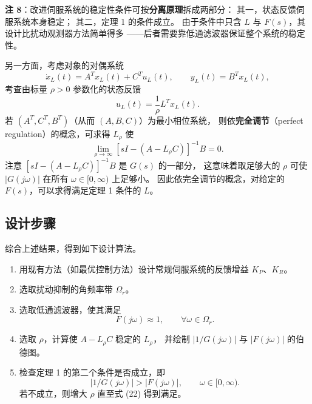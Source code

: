 \documentclass[11pt,a4paper]{ctexart}
\begin{document}
\textbf{注 8}：改进伺服系统的稳定性条件可按\textbf{分离原理}拆成两部分：
其一，状态反馈伺服系统本身稳定；
其二，定理 1 的条件成立。
由于条件中只含 $L$ 与 $F(s)$，其设计比扰动观测器方法简单得多
——后者需要靠低通滤波器保证整个系统的稳定性。

另一方面，考虑对象的对偶系统
\begin{equation}
\dot x_L(t)=A^{T}x_L(t)+C^{T}u_L(t),\qquad
y_L(t)=B^{T}x_L(t),
\end{equation}
考查由标量 $\rho>0$ 参数化的状态反馈
\begin{equation}
u_L(t)=\frac{1}{\rho}L^{T}x_L(t).
\end{equation}
若 $(A^{T},C^{T},B^{T})$（从而 $(A,B,C)$）为最小相位系统，
则依\textbf{完全调节}（perfect regulation）的概念，可求得 $L_\rho$ 使
\begin{equation}
\lim_{\rho\to\infty}\left[sI-(A-L_\rho C)\right]^{-1}B=0.
\end{equation}
注意 $\left[sI-(A-L_\rho C)\right]^{-1}B$ 是 $G(s)$ 的一部分，
这意味着取足够大的 $\rho$ 可使 $|G(j\omega)|$ 在所有 $\omega\in[0,\infty)$ 上足够小。
因此依完全调节的概念，对给定的 $F(s)$，可以求得满足定理 1 条件的 $L$。

\subsection{设计步骤}

综合上述结果，得到如下设计算法。

\begin{enumerate}[label=\textbf{Step \arabic*)}]
\item 用现有方法（如最优控制方法）设计常规伺服系统的反馈增益 $K_P$、$K_R$。
\item 选取扰动抑制的角频率带 $\Omega_r$。
\item 选取低通滤波器，使其满足
\begin{equation}
F(j\omega)\approx 1,\qquad \forall\omega\in\Omega_r.
\end{equation}
\item 选取 $\rho$，计算使 $A-L_\rho C$ 稳定的 $L_\rho$，
并绘制 $|1/G(j\omega)|$ 与 $|F(j\omega)|$ 的伯德图。
\item 检查定理 1 的第二个条件是否成立，即
\begin{equation}
\left|1/G(j\omega)\right|>\left|F(j\omega)\right|,\qquad \omega\in[0,\infty).
\end{equation}
若不成立，则增大 $\rho$ 直至式 (22) 得到满足。
\end{enumerate}
\end{document}
